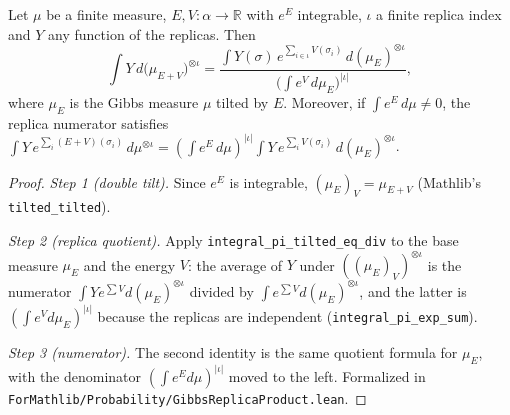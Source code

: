 \begin{lemma}\label{lem:sg-tal:perceptron-cavity-ratio-model-free}
  \leanok
Let $\mu$ be a finite measure, $E,V:\alpha\to\mathbb R$ with $e^E$ integrable, $\iota$ a finite replica index and $Y$ any function of the
replicas. Then
\[
 \int Y\,d\bigl(\mu_{E+V}\bigr)^{\otimes\iota}
 =\frac{\int Y(\sigma)\,e^{\sum_{i\in\iota}V(\sigma_i)}\,d(\mu_E)^{\otimes\iota}}{\bigl(\int e^{V}\,d\mu_E\bigr)^{|\iota|}},
\]
where $\mu_E$ is the Gibbs measure $\mu$ tilted by $E$. Moreover, if $\int e^{E}\,d\mu\neq0$, the replica numerator satisfies
$\int Y\,e^{\sum_i(E+V)(\sigma_i)}\,d\mu^{\otimes\iota}=(\int e^E\,d\mu)^{|\iota|}\int Y\,e^{\sum_iV(\sigma_i)}\,d(\mu_E)^{\otimes\iota}$.
\end{lemma}
\begin{proof}
  \leanok
\emph{Step 1 (double tilt).} Since $e^E$ is integrable, $(\mu_E)_V=\mu_{E+V}$ (Mathlib's \texttt{tilted\_tilted}).

\emph{Step 2 (replica quotient).} Apply \texttt{integral\_pi\_tilted\_eq\_div} to the base measure $\mu_E$ and the energy $V$: the average of $Y$ under
$((\mu_E)_V)^{\otimes\iota}$ is the numerator $\int Ye^{\sum V}d(\mu_E)^{\otimes\iota}$ divided by $\int e^{\sum V}d(\mu_E)^{\otimes\iota}$,
and the latter is $(\int e^V d\mu_E)^{|\iota|}$ because the replicas are independent (\texttt{integral\_pi\_exp\_sum}).

\emph{Step 3 (numerator).} The second identity is the same quotient formula for $\mu_E$, with the denominator $(\int e^E d\mu)^{|\iota|}$ moved
to the left. Formalized in \texttt{ForMathlib/Probability/GibbsReplicaProduct.lean}.
\end{proof}

